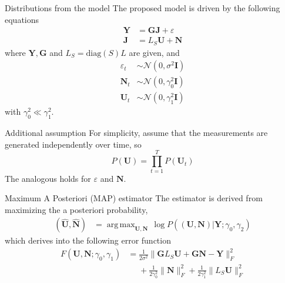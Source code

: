 \documentclass[progressbar=head]{beamer}
\newcommand{\ppar}[1]{ \left( #1 \right) }
\DeclareMathOperator*{\argmax}{arg\,max}
\newcommand{\nnorm}[1]{\lVert #1 \rVert}
\newcommand{\J}{\mathbf{J}}
\newcommand{\Y}{\mathbf{Y}}
\newcommand{\G}{\mathbf{G}}
\newcommand{\U}{\mathbf{U}}
\newcommand{\N}{\mathbf{N}}
\newcommand{\id}{\mathbf{I}}
\newcommand{\norm}{\mathcal{N}}
\begin{document}
\begin{frame}{Distributions from the model}
The proposed model is driven by the following equations
\begin{align}
    \Y &= \G \J + \varepsilon \\
    \J &=  L_S \U + \N
\end{align}
where $\Y, \G$ and $L_S = \text{diag}\ppar{S} L$ are given, and
\begin{align}
    \varepsilon_t &\sim  \norm\ppar{0, \sigma^2 \id } \\
    \N_t &\sim  
    \norm\ppar{0, \gamma_0^2 \id } \\
    \U_t &\sim  
    \norm\ppar{0, \gamma_1^2 \id } 
\end{align}
with $\gamma_0^2 \ll \gamma_1^2$.
\end{frame}

\begin{frame}{Additional assumption}
For simplicity, assume that
the measurements are generated independently over time, so
\begin{equation}
    P\ppar{ \U } = \prod_{t=1}^T P\ppar{ \U_t }
\end{equation}
The analogous holds for $\varepsilon$ and $\N$.
\end{frame}

\begin{frame}{Maximum A Posteriori (MAP) estimator}
The estimator is derived from maximizing the a posteriori probability,
\begin{align}
    \ppar{ \hat{\U}, \hat{\N} } &=
    \argmax_{\U, \N }\,
    \log P\ppar{\ppar{ {\U}, {\N} } \Big| {\Y; \gamma_0, \gamma_2} }
\end{align}
which derives into the following error function
\begin{align}
    F\ppar{ {\U}, {\N};  \gamma_0, \gamma_1} &=
    \frac{1}{2\sigma^2}
    \nnorm{\G L_S \U + \G \N - \Y}_F^2
    \nonumber \\
    &\phantom{=}
    +
    \frac{1}{2\gamma_0^2} \nnorm{\N}_F^2
    +
    \frac{1}{2\gamma_1^2} \nnorm{L_S \U}_F^2
\end{align}
\end{frame}
\end{document}
